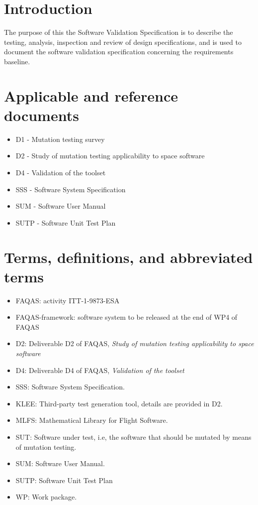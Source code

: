 
\chapter{Introduction}

The purpose of this the Software Validation Specification is to describe the testing, analysis, inspection and
review of design specifications, and is used to document the software validation specification concerning the requirements baseline.

\chapter{Applicable and reference documents}

\begin{itemize}
\item{D1 - Mutation testing survey}
\item{D2 - Study of mutation testing applicability to space software}
\item{D4 - Validation of the toolset}
\item{SSS - Software System Specification}
\item{SUM - Software User Manual}
\item{SUTP - Software Unit Test Plan}

\end{itemize}

\chapter{Terms, definitions, and abbreviated terms}

\begin{itemize}
\item{FAQAS}: activity ITT-1-9873-ESA
\item{FAQAS-framework}: software system to be released at the end of WP4 of FAQAS
\item{D2}: Deliverable D2 of FAQAS, \emph{Study of mutation testing applicability to space software}
\item{D4}: Deliverable D4 of FAQAS, \emph{Validation of the toolset}
\item{SSS}: Software System Specification.
\item{KLEE}: Third-party test generation tool, details are provided in D2.
\item{MLFS}: Mathematical Library for Flight Software.
\item{SUT}: Software under test, i.e, the software that should be mutated by means of mutation testing.
\item{SUM}: Software User Manual.
\item{SUTP}: Software Unit Test Plan
\item{WP}: Work package.

\end{itemize}

